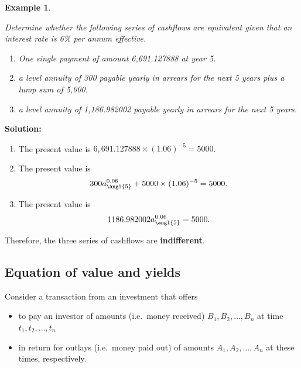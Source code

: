 \documentclass[landscape, 20pt]{extreport}
\theoremstyle{definition}
\theoremstyle{definition}
\newtheorem{example}{Example}[chapter]
\theoremstyle{definition}
\theoremstyle{definition}
\theoremstyle{remark}
\begin{document}
\newpage \begin{example}
\protect\hypertarget{exm:unlabeled-div-38}{}\label{exm:unlabeled-div-38}

\emph{Determine whether the following series of cashflows
are equivalent given that an interest rate is 6\% per annum effective.}

\begin{enumerate}
\def\labelenumi{\arabic{enumi}.}
\item
  \emph{One single payment of amount 6,691.127888 at year 5.}
\item
  \emph{a level annuity of 300 payable yearly in arrears for the next 5
  years plus a lump sum of 5,000.}
\item
  \emph{a level annuity of 1,186.982002 payable yearly in arrears for the
  next 5 years.}
\end{enumerate}

\end{example}

\textbf{Solution:}

\begin{enumerate}
\def\labelenumi{\arabic{enumi}.}
\item
  The present value is \(6,691.127888 \times (1.06)^{-5} = 5000\).
\item
  The present value is
  \[300 a^{0.06}_{\angl{5}}   + 5000 \times (1.06)^{-5}  = 5000.\]
\item
  The present value is \[1186.982002 a^{0.06}_{\angl{5}}     = 5000.\]
\end{enumerate}

Therefore, the three series of cashflows are \textbf{indifferent}.

\hypertarget{equation-of-value-and-yields}{%
\subsection{Equation of value and yields}\label{equation-of-value-and-yields}}

Consider a transaction from an investment that offers

\begin{itemize}
\item
  to pay an investor of amounts (i.e.~money received)
  \(B_1, B_2, \ldots, B_n\) at time \(t_1, t_2, \ldots ,t_n\)
\item
  in return for outlays (i.e.~money paid out) of amounts
  \(A_1, A_2, \ldots, A_n\) at these times, respectively.
\end{itemize}
\end{document}
